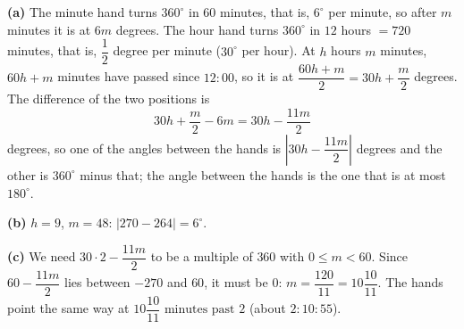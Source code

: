 \textbf{(a)} The minute hand turns $360^\circ$ in $60$ minutes, that is, $6^\circ$ per minute, so after $m$ minutes it is at $6m$ degrees. The hour hand turns $360^\circ$ in $12$ hours $=720$ minutes, that is, $\dfrac12$ degree per minute ($30^\circ$ per hour). At $h$ hours $m$ minutes, $60h+m$ minutes have passed since $12{:}00$, so it is at $\dfrac{60h+m}{2}=30h+\dfrac m2$ degrees. The difference of the two positions is
\[30h+\dfrac m2-6m=30h-\dfrac{11m}{2}\]
degrees, so one of the angles between the hands is $\left|30h-\dfrac{11m}{2}\right|$ degrees and the other is $360^\circ$ minus that; the angle between the hands is the one that is at most $180^\circ$.

\textbf{(b)} $h=9$, $m=48$: $\left|270-264\right|=\boxed{6^\circ}$.

\textbf{(c)} We need $30\cdot2-\dfrac{11m}{2}$ to be a multiple of $360$ with $0\le m<60$. Since $60-\dfrac{11m}2$ lies between $-270$ and $60$, it must be $0$: $m=\dfrac{120}{11}=10\dfrac{10}{11}$. The hands point the same way at $\boxed{10\dfrac{10}{11}\text{ minutes past }2}$ (about $2{:}10{:}55$).

